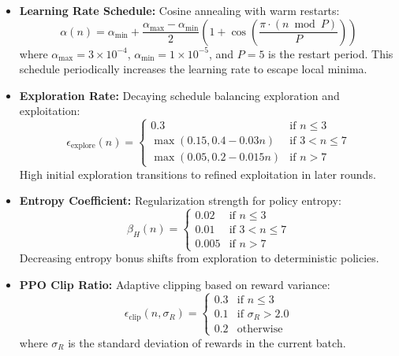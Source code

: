 \documentclass[conference]{IEEEtran}
\begin{document}
\begin{itemize}
    \item \textbf{Learning Rate Schedule:} Cosine annealing with warm restarts:
    \begin{equation}
    \alpha(n) = \alpha_{\min} + \frac{\alpha_{\max} - \alpha_{\min}}{2}\left(1 + \cos\left(\frac{\pi \cdot (n \bmod P)}{P}\right)\right)
    \end{equation}
    where $\alpha_{\max} = 3 \times 10^{-4}$, $\alpha_{\min} = 1 \times 10^{-5}$, and $P = 5$ is the restart period. This schedule periodically increases the learning rate to escape local minima.
    
    \item \textbf{Exploration Rate:} Decaying schedule balancing exploration and exploitation:
    \begin{equation}
    \epsilon_{\text{explore}}(n) = \begin{cases}
    0.3 & \text{if } n \leq 3 \\
    \max(0.15, 0.4 - 0.03n) & \text{if } 3 < n \leq 7 \\
    \max(0.05, 0.2 - 0.015n) & \text{if } n > 7
    \end{cases}
    \end{equation}
    High initial exploration transitions to refined exploitation in later rounds.
    
    \item \textbf{Entropy Coefficient:} Regularization strength for policy entropy:
    \begin{equation}
    \beta_H(n) = \begin{cases}
    0.02 & \text{if } n \leq 3 \\
    0.01 & \text{if } 3 < n \leq 7 \\
    0.005 & \text{if } n > 7
    \end{cases}
    \end{equation}
    Decreasing entropy bonus shifts from exploration to deterministic policies.
    
    \item \textbf{PPO Clip Ratio:} Adaptive clipping based on reward variance:
    \begin{equation}
    \epsilon_{\text{clip}}(n, \sigma_R) = \begin{cases}
    0.3 & \text{if } n \leq 3 \\
    0.1 & \text{if } \sigma_R > 2.0 \\
    0.2 & \text{otherwise}
    \end{cases}
    \end{equation}
    where $\sigma_R$ is the standard deviation of rewards in the current batch.
\end{itemize}
\end{document}
